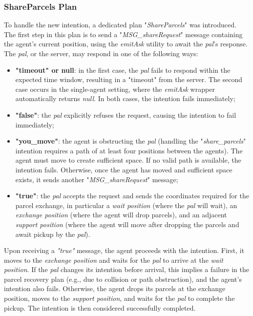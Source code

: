         \subsubsection{ShareParcels Plan}
            To handle the new intention, a dedicated plan "\textit{ShareParcels}" was introduced. The first step in this plan is to send a "\textit{MSG\_shareRequest}" message containing the agent's current position, using the \textit{emitAsk} utility to await the \textit{pal}'s response. The \textit{pal}, or the server, may respond in one of the following ways:
            \begin{itemize}
                \item \textbf{"timeout" or null}: in the first case, the \textit{pal} fails to respond within the expected time window, resulting in a "timeout" from the server. The second case occurs in the single-agent setting, where the \textit{emitAsk} wrapper automatically returns \textit{null}. In both cases, the intention fails immediately;
                \item \textbf{"false"}: the \textit{pal} explicitly refuses the request, causing the intention to fail immediately;
                \item \textbf{"you\_move"}: the agent is obstructing the \textit{pal} (handling the "\textit{share\_parcels}" intention requires a path of at least four positions between the agents). The agent must move to create sufficient space. If no valid path is available, the intention fails. Otherwise, once the agent has moved and sufficient space exists, it sends another "\textit{MSG\_shareRequest}" message;
                \item \textbf{"true"}: the \textit{pal} accepts the request and sends the coordinates required for the parcel exchange, in particular a \textit{wait position} (where the \textit{pal} will wait), an \textit{exchange position} (where the agent will drop parcels), and an adjacent \textit{support position} (where the agent will move after dropping the parcels and await pickup by the \textit{pal}).
            \end{itemize}                   
            Upon receiving a \textit{"true"} message, the agent proceeds with the intention. First, it moves to the \textit{exchange position} and waits for the \textit{pal} to arrive at the \textit{wait position}. If the \textit{pal} changes its intention before arrival, this implies a failure in the parcel recovery plan (e.g., due to collision or path obstruction), and the agent's intention also fails. Otherwise, the agent drops its parcels at the exchange position, moves to the \textit{support position}, and waits for the \textit{pal} to complete the pickup. The intention is then considered successfully completed.

